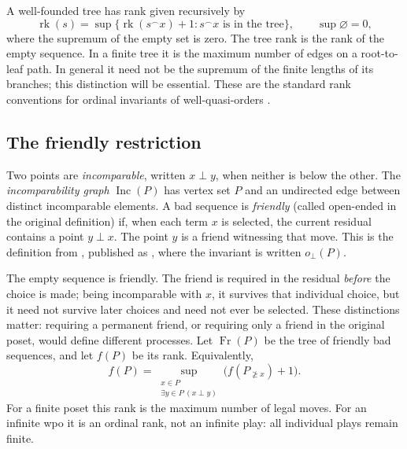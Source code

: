\documentclass[11pt,letterpaper]{article}
\theoremstyle{definition}
\theoremstyle{remark}
\newcommand{\Fr}{\operatorname{Fr}}
\newcommand{\Inc}{\operatorname{Inc}}
\newcommand{\rk}{\operatorname{rk}}
\newcommand{\res}[2]{#1_{\not\ge #2}}
\begin{document}
A well-founded tree has rank given recursively by
\begin{equation}\label{eq:tree-rank}
 \rk(s)
 =\sup\{\rk(s^{\frown}x)+1:s^{\frown}x\text{ is in the tree}\},
 \qquad\sup\varnothing=0,
\end{equation}
where the supremum of the empty set is zero. The tree rank is the rank of
the empty sequence. In a finite tree it is the maximum number of edges on a
root-to-leaf path. In general it need not be the supremum of the finite
lengths of its branches; this distinction will be essential. These are the
standard rank conventions for ordinal invariants of well-quasi-orders
\cite{DSS}.

\subsection{The friendly restriction}
Two points are \emph{incomparable}, written $x\perp y$, when neither is
below the other. The \emph{incomparability graph} $\Inc(P)$ has vertex set
$P$ and an undirected edge between distinct incomparable elements. A bad
sequence is \emph{friendly} (called open-ended in the original definition)
if, when each term $x$ is selected, the current residual contains a point
$y\perp x$. The point $y$ is a friend witnessing that move. This is the
definition from \cite[Definition~5.3.2]{VialardThesis}, published as
\cite[Definition~3.3]{Vialard2023}, where the invariant is written
$o_\perp(P)$.

The empty sequence is friendly. The friend is required in the residual
\emph{before} the choice is made; being incomparable with $x$, it survives
that individual choice, but it need not survive later choices and need not
ever be selected. These distinctions matter: requiring a permanent friend,
or requiring only a friend in the original poset, would define different
processes. Let $\Fr(P)$ be the tree of friendly bad sequences, and
let $f(P)$ be its rank. Equivalently,
\begin{equation}\label{eq:f-residual}
 f(P)=\sup_{\substack{x\in P\\ \exists y\in P\ (x\perp y)}}
       \bigl(f(\res P x)+1\bigr).
\end{equation}
For a finite poset this rank is the maximum number of legal moves. For an
infinite wpo it is an ordinal rank, not an infinite play: all individual
plays remain finite.
\end{document}
